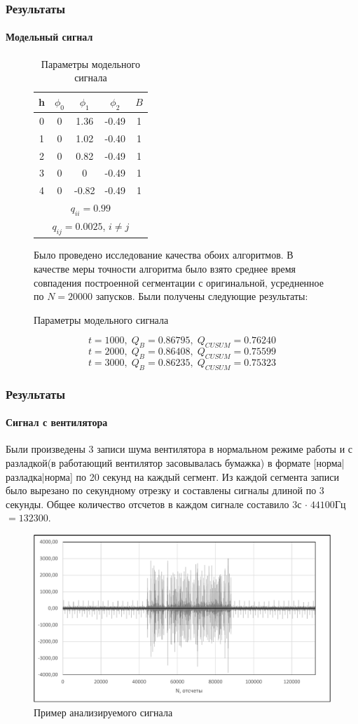 \documentclass[9pt]{beamer}
\begin{document}
\begin{frame}\frametitle{Результаты}
\framesubtitle{Модельный сигнал}
\begin{figure}[h]
\begin{minipage}[h]{0.4\linewidth}
\begin{table}[h]
\caption{Параметры модельного сигнала}
\label{signal_param}
\begin{tabular}{|c|c|c|c|c|}
\hline
h & $\phi_0$ & $\phi_1$ & $\phi_2$ & $B$\\
\hline
0 & 0 & 1.36 & -0.49 & 1\\
\hline
1 & 0 & 1.02 & -0.40 & 1\\
\hline
2 & 0 & 0.82 & -0.49 & 1\\
\hline
3 & 0 & 0 & -0.49 & 1\\
\hline
4 & 0 & -0.82 & -0.49 & 1\\
\hline
\multicolumn{5}{|c|}{$q_{ii} = 0.99$}\\
\hline
\multicolumn{5}{|c|}{$q_{ij} = 0.0025$, $i \neq j$}\\
\hline
\end{tabular}
\end{table}
\end{minipage}
\begin{minipage}[h]{0.4\linewidth}
Было проведено исследование качества обоих алгоритмов. В качестве меры точности алгоритма было взято среднее время совпадения построенной сегментации с оригинальной, усредненное по $N = 20000$ запусков. Были получены следующие результаты:
\end{minipage}
\end{figure}
$$t = 1000,\; Q_B = 0.86795,\; Q_{CUSUM} = 0.76240$$
$$t = 2000,\; Q_B = 0.86408,\; Q_{CUSUM} = 0.75599$$
$$t = 3000,\; Q_B = 0.86235,\; Q_{CUSUM} = 0.75323$$
\end{frame}

\begin{frame}\frametitle{Результаты}
\framesubtitle{Сигнал с вентилятора}
Были произведены 3 записи шума вентилятора в нормальном режиме работы и с разладкой(в работающий вентилятор засовывалась бумажка) в формате [норма|разладка|норма] по 20 секунд на каждый сегмент. Из каждой сегмента записи было вырезано по секундному отрезку и составлены сигналы длиной по 3 секунды. Общее количество отсчетов в каждом сигнале составило $3$с $\cdot\;44100$Гц $ = 132300.$
\begin{figure}[h]
\includegraphics[width=0.7\linewidth]{signal_example}
\caption{Пример анализируемого сигнала}
\end{figure}
\end{frame}
\end{document}
